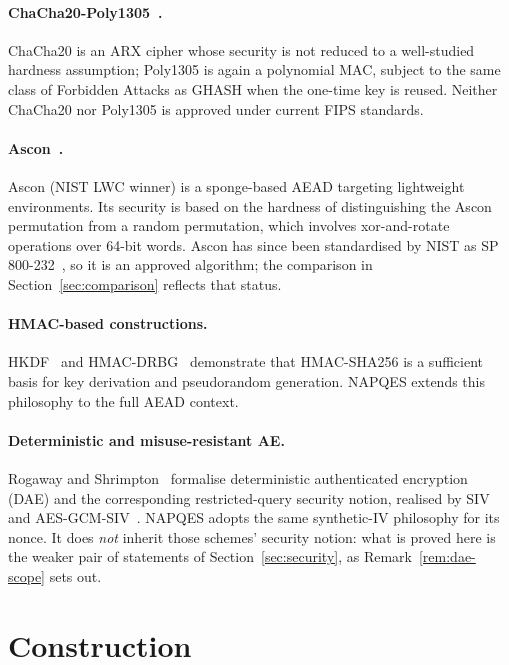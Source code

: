 \documentclass[11pt,a4paper]{article}
\begin{document}
\paragraph{ChaCha20-Poly1305~\cite{rfc8439}.}
ChaCha20 is an ARX cipher whose security is not reduced to a well-studied
hardness assumption; Poly1305 is again a polynomial MAC, subject to the
same class of Forbidden Attacks as GHASH when the one-time key is reused.
Neither ChaCha20 nor Poly1305 is approved under current FIPS standards.

\paragraph{Ascon~\cite{ascon2021}.}
Ascon (NIST LWC winner) is a sponge-based AEAD targeting lightweight
environments. Its security is based on the hardness of distinguishing the
Ascon permutation from a random permutation, which involves xor-and-rotate
operations over 64-bit words. Ascon has since been standardised by NIST as
SP 800-232~\cite{sp800-232}, so it is an approved algorithm; the
comparison in Section~\ref{sec:comparison} reflects that status.

\paragraph{HMAC-based constructions.}
HKDF~\cite{rfc5869} and HMAC-DRBG~\cite{nist-drbg} demonstrate that
HMAC-SHA256 is a sufficient basis for key derivation and pseudorandom
generation. NAPQES extends this philosophy to the full AEAD context.

\paragraph{Deterministic and misuse-resistant AE.}
Rogaway and Shrimpton~\cite{rogaway2006} formalise deterministic
authenticated encryption (DAE) and the corresponding restricted-query
security notion, realised by SIV~\cite{rfc5297} and
AES-GCM-SIV~\cite{rfc8452}. NAPQES adopts the same synthetic-IV philosophy
for its nonce. It does \emph{not} inherit those schemes' security notion:
what is proved here is the weaker pair of statements of
Section~\ref{sec:security}, as Remark~\ref{rem:dae-scope} sets out.

\section{Construction}
\label{sec:construction}
\end{document}

